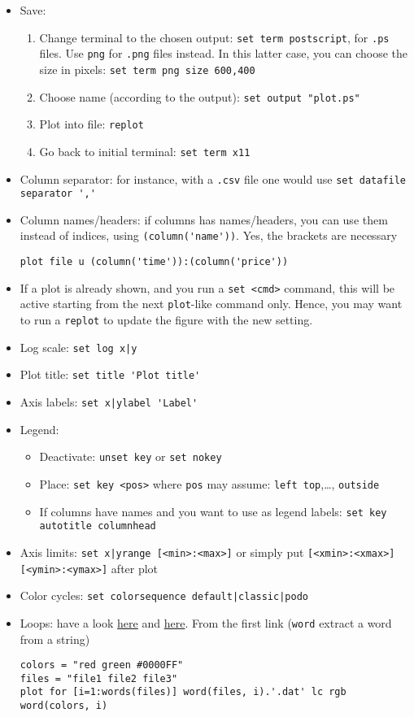 \documentclass[a4paper,12pt,%
              final%
              ]{article}
\begin{document}
\begin{itemize}
  \item Save:
    \begin{enumerate}
      \item Change terminal to the chosen output: \verb|set term postscript|, for \texttt{.ps} files. Use \texttt{png} for \texttt{.png} files instead. In this latter case, you can choose the size in pixels: \verb|set term png size 600,400|
      \item Choose name (according to the output): \verb|set output "plot.ps"|
      \item Plot into file: \verb|replot|
      \item Go back to initial terminal: \verb|set term x11|
    \end{enumerate}
  \item Column separator: for instance, with a \texttt{.csv} file one would use \verb|set datafile separator ','|
  \item Column names/headers: if columns has names/headers, you can use them instead of indices, using \verb|(column('name'))|. Yes, the brackets are necessary
\begin{verbatim}
plot file u (column('time')):(column('price'))
\end{verbatim}
  \item If a plot is already shown, and you run a \verb|set <cmd>| command, this will be active starting from the next \verb|plot|-like command only. Hence, you may want to run a \verb|replot| to update the figure with the new setting.
  \item Log scale: \verb!set log x|y!
  \item Plot title: \verb|set title 'Plot title'|
  \item Axis labels: \verb!set x|ylabel 'Label'!
  \item Legend:
    \begin{itemize}
      \item Deactivate: \verb|unset key| or \verb|set nokey|
      \item Place: \verb|set key <pos>| where \verb|pos| may assume: \verb|left top|,\ldots, \verb|outside|
      \item If columns have names and you want to use as legend labels: \texttt{set key autotitle columnhead}
    \end{itemize}
  \item Axis limits: \verb!set x|yrange [<min>:<max>]! or simply put \verb![<xmin>:<xmax>] [<ymin>:<ymax>]! after plot
  \item Color cycles: \verb!set colorsequence default|classic|podo!
  \item Loops: have a look \href{https://stackoverflow.com/a/18592561}{here} and \href{https://stackoverflow.com/a/14947085}{here}. From the first link (\verb|word| extract a word from a string)
\begin{verbatim}
colors = "red green #0000FF"
files = "file1 file2 file3"
plot for [i=1:words(files)] word(files, i).'.dat' lc rgb word(colors, i)
\end{verbatim}
\end{itemize}
\end{document}
